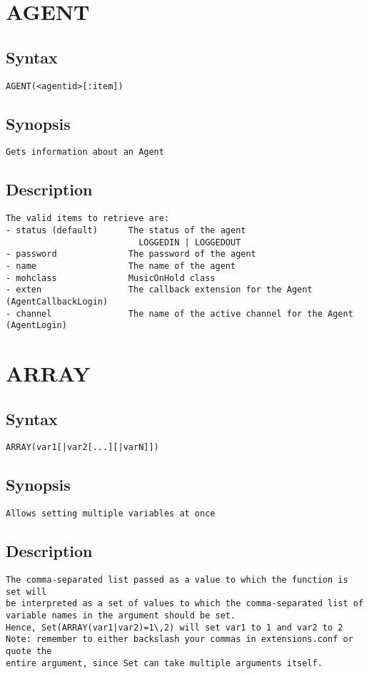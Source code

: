 \section{AGENT}
\subsection{Syntax}
\begin{verbatim}
AGENT(<agentid>[:item])
\end{verbatim}
\subsection{Synopsis}
\begin{verbatim}
Gets information about an Agent
\end{verbatim}
\subsection{Description}
\begin{verbatim}
The valid items to retrieve are:
- status (default)      The status of the agent
                          LOGGEDIN | LOGGEDOUT
- password              The password of the agent
- name                  The name of the agent
- mohclass              MusicOnHold class
- exten                 The callback extension for the Agent (AgentCallbackLogin)
- channel               The name of the active channel for the Agent (AgentLogin)

\end{verbatim}


\section{ARRAY}
\subsection{Syntax}
\begin{verbatim}
ARRAY(var1[|var2[...][|varN]])
\end{verbatim}
\subsection{Synopsis}
\begin{verbatim}
Allows setting multiple variables at once
\end{verbatim}
\subsection{Description}
\begin{verbatim}
The comma-separated list passed as a value to which the function is set will
be interpreted as a set of values to which the comma-separated list of
variable names in the argument should be set.
Hence, Set(ARRAY(var1|var2)=1\,2) will set var1 to 1 and var2 to 2
Note: remember to either backslash your commas in extensions.conf or quote the
entire argument, since Set can take multiple arguments itself.

\end{verbatim}


